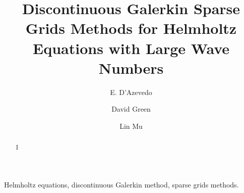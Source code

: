 \documentclass[preprint,11pt]{elsarticle}
\begin{document}
\begin{frontmatter}

\title{Discontinuous Galerkin Sparse Grids Methods for Helmholtz Equations with Large Wave Numbers}

\author[1]{E. D'Azevedo}
\address[1]{Computational and Applied Mathematics Division, Oak Ridge National Laboratory, Oak Ridge, TN 37831, USA}

\author[2]{David Green}
\address[2]{Fusion \& Materials for Nuclear Systems Division
Oak Ridge National Laboratory, Oak Ridge, TN 37831, USA}

\author[3]{Lin Mu}%
\address[3]{Computational and Applied Mathematics Division, Oak Ridge National Laboratory, Oak Ridge,  TN 37831, USA}



\begin{abstract}
I
\end{abstract}

\begin{keyword}
Helmholtz equations, discontinuous Galerkin method, sparse grids methods.
\end{keyword}

\end{frontmatter}




\end{document}

